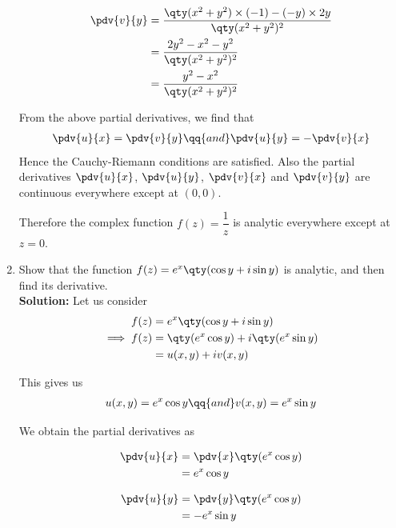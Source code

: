 \begin{enumerate}
\begin{multicols}{2}
				\begin{align*}
					\pdv{v}{y}&=\dfrac{\qty(x^2+y^2)\times (-1)-(-y)\times 2y}{\qty(x^2+y^2)^2} \\
					&=\dfrac{2y^2-x^2-y^2}{\qty(x^2+y^2)^2} \\
					&=\dfrac{y^2-x^2}{\qty(x^2+y^2)^2}
				\end{align*}
			\end{multicols}
			From the above partial derivatives, we find that
			\begin{align*}
				\pdv{u}{x}=\pdv{v}{y}\qq{and}\pdv{u}{y}=-\pdv{v}{x}
			\end{align*}
			Hence the Cauchy-Riemann conditions are satisfied. Also the partial derivatives $\pdv{u}{x}$, $\pdv{u}{y}$, $\pdv{v}{x}$ and $\pdv{v}{y}$ are continuous everywhere except at $(0,0)$.
			
			Therefore the complex function $f(z)=\dfrac{1}{z}$ is analytic everywhere except at $z=0$.
			
			\item Show that the function $f(z)=e^x\qty(\cos{y}+i\sin{y})$ is analytic, and then find its derivative.\\
			\textbf{Solution:} Let us consider
			\begin{align*}
				f(z)&=e^x\qty(\cos{y}+i\sin{y}) \\
				\implies f(z)&=\qty(e^x\cos{y})+i\qty(e^x\sin{y}) \\
				&=u(x,y)+iv(x,y)
			\end{align*}
			
			This gives us
			\begin{align*}
				u(x,y)=e^x\cos{y}\qq{and}v(x,y)=e^x\sin{y}
			\end{align*}
			
			We obtain the partial derivatives as\vspace{-3ex}
			\begin{multicols}{2}
				\begin{align*}
					\pdv{u}{x}&=\pdv{x}\qty(e^x\cos{y}) \\
						&=e^x\cos{y}
				\end{align*}
				
				\begin{align*}
					\pdv{u}{y}&=\pdv{y}\qty(e^x\cos{y}) \\
						&=-e^x\sin{y}
				\end{align*}
			\end{multicols}
			\vspace{-3ex}
			

\end{enumerate}
